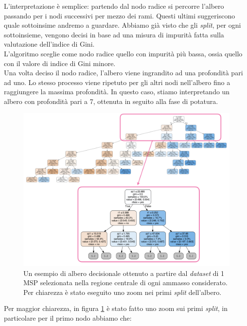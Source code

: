 L'interpretazione è semplice: partendo dal nodo radice si percorre l'albero passando per i nodi successivi per mezzo dei rami. Questi ultimi suggeriscono quale sottoinsime andremo a guardare. Abbiamo già visto che gli \textit{split}, per ogni sottoinsieme, vengono decisi in base ad una misura di impurità fatta sulla valutazione dell'indice di Gini.\\ L'algoritmo sceglie come nodo radice quello con impurità più bassa, ossia quello con il valore di indice di Gini minore.\\ Una volta deciso il nodo radice, l’albero viene ingrandito ad una profondità pari ad uno. Lo stesso processo viene ripetuto per gli altri nodi nell’albero fino a raggiungere la massima profondità. In questo caso, stiamo interpretando un albero con profondità pari a 7, ottenuta in seguito alla fase di potatura.
\begin{figure}[H]
\begin{center}
\includegraphics[width=1.1\columnwidth]{images/tree_1part_ok.png}
\end{center}
\caption{Un esempio di albero decisionale ottenuto a partire dal \textit{dataset} di 1 MSP selezionata nella regione centrale di ogni ammasso considerato. Per chiarezza è stato eseguito uno zoom nei primi \textit{split} dell'albero.}
\label{fig:tree_1part}
\end{figure}
Per maggior chiarezza, in figura \ref{fig:tree_1part} è stato fatto uno zoom sui primi \textit{split}, in particolare per il primo nodo abbiamo che:
